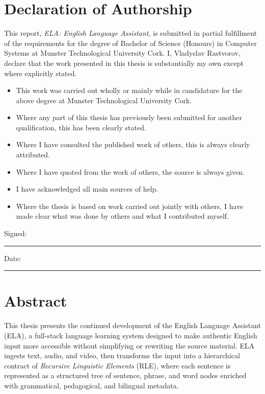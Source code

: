 \documentclass[12pt,a4paper,oneside]{report}
\begin{document}

\chapter*{Declaration of Authorship}
This report, \emph{ELA: English Language Assistant}, is submitted in partial fulfillment of the requirements for the degree of Bachelor of Science (Honours) in Computer Systems at Munster Technological University Cork. I, Vladyslav Rastvorov, declare that the work presented in this thesis is substantially my own except where explicitly stated.

\begin{itemize}
  \item This work was carried out wholly or mainly while in candidature for the above degree at Munster Technological University Cork.
  \item Where any part of this thesis has previously been submitted for another qualification, this has been clearly stated.
  \item Where I have consulted the published work of others, this is always clearly attributed.
  \item Where I have quoted from the work of others, the source is always given.
  \item I have acknowledged all main sources of help.
  \item Where the thesis is based on work carried out jointly with others, I have made clear what was done by others and what I contributed myself.
\end{itemize}

\vspace{1.4cm}
\noindent Signed:\ \rule{7cm}{0.4pt}

\vspace{0.8cm}
\noindent Date:\ \rule{4cm}{0.4pt}

\chapter*{Abstract}
This thesis presents the continued development of the English Language Assistant (ELA), a full-stack language learning system designed to make authentic English input more accessible without simplifying or rewriting the source material. ELA ingests text, audio, and video, then transforms the input into a hierarchical contract of \emph{Recursive Linguistic Elements} (RLE), where each sentence is represented as a structured tree of sentence, phrase, and word nodes enriched with grammatical, pedagogical, and bilingual metadata.
\end{document}
